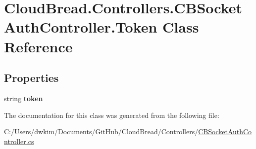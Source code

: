 \hypertarget{a00107}{}\section{Cloud\+Bread.\+Controllers.\+C\+B\+Socket\+Auth\+Controller.\+Token Class Reference}
\label{a00107}
\subsection*{Properties}
\begin{DoxyCompactItemize}
\item 
string {\bfseries token}\hypertarget{a00107_a908ea9233c9edbdd496c92edbc15aef1}{}\label{a00107_a908ea9233c9edbdd496c92edbc15aef1}

\end{DoxyCompactItemize}


The documentation for this class was generated from the following file\+:\begin{DoxyCompactItemize}
\item 
C\+:/\+Users/dwkim/\+Documents/\+Git\+Hub/\+Cloud\+Bread/\+Controllers/\hyperlink{a00153}{C\+B\+Socket\+Auth\+Controller.\+cs}\end{DoxyCompactItemize}

